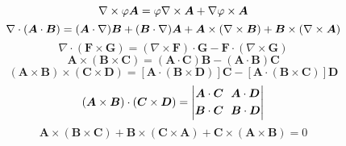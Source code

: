 \documentclass[UTF8,9pt]{ctexart}
\begin{document}
$$\nabla\times\varphi\bm{A}=\varphi\nabla\times\bm{A}+\nabla\varphi\times\bm{A}$$
$$\nabla\cdot(\bm{A}\cdot\bm{B}) = (\bm{A}\cdot\nabla)\bm{B}+(\bm{B}\cdot\nabla)\bm{A}+\bm{A}\times(\nabla\times\bm{B})+\bm{B}\times(\nabla\times\bm{A})$$
$$\nabla\cdot(\bm{F} \times \bm{G})=(\nabla\times \bm{F})\cdot \bm{G}-\bm{F}\cdot(\nabla\times \bm{G})$$
$$\bm{A}\times(\bm{B}\times\bm{C})=(\bm{A}\cdot\bm{C})\bm{B}-(\bm{A}\cdot\bm{B})\bm{C}$$
$$( \bm{ A } \times \bm{ B } ) \times ( \bm{ C } \times \bm{ D } ) = [ \bm{ A } \cdot ( \bm{ B } \times \bm{ D } ) ] \bm{ C } - [ \bm{ A } \cdot ( \bm{ B } \times \bm{ C } ) ] \bm{ D }$$
$$( \bm{ A } \times \bm{ B } ) \cdot ( \bm{ C } \times \bm{ D } ) = \abs{\ar{\bm{A}\cdot\bm{C}&\ \ \bm{A}\cdot\bm{D}\\
\bm{B}\cdot\bm{C}&\ \ \bm{B}\cdot\bm{D}}}$$
$$\bm{ A } \times ( \bm{ B } \times \bm{ C } ) + \bm{ B } \times ( \bm{ C } \times \bm{ A } ) + \bm{ C } \times ( \bm{ A } \times \bm{ B } ) = 0$$
\end{document}
